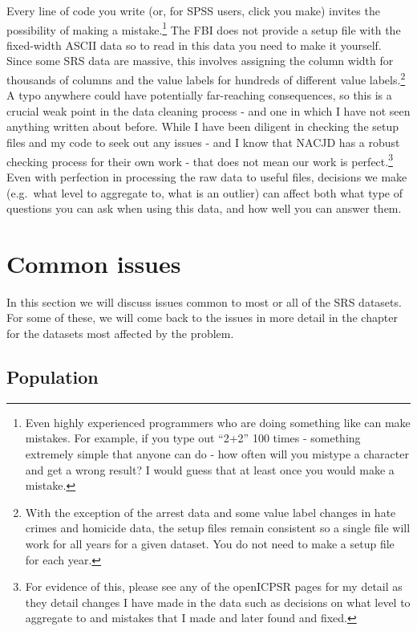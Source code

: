 \documentclass[
]{krantz}
\begin{document}
Every line of code you write (or, for SPSS users, click you
make) invites the possibility of making a
mistake.\footnote{Even highly experienced programmers who
  are doing something like can make mistakes. For example,
  if you type out ``2+2'' 100 times - something extremely
  simple that anyone can do - how often will you mistype a
  character and get a wrong result? I would guess that at
  least once you would make a mistake.} The FBI does not
provide a setup file with the fixed-width ASCII data so to
read in this data you need to make it yourself. Since some
SRS data are massive, this involves assigning the column
width for thousands of columns and the value labels for
hundreds of different value labels.\footnote{With the
  exception of the arrest data and some value label changes
  in hate crimes and homicide data, the setup files remain
  consistent so a single file will work for all years for a
  given dataset. You do not need to make a setup file for
  each year.} A typo anywhere could have potentially
far-reaching consequences, so this is a crucial weak point
in the data cleaning process - and one in which I have not
seen anything written about before. While I have been
diligent in checking the setup files and my code to seek out
any issues - and I know that NACJD has a robust checking
process for their own work - that does not mean our work is
perfect.\footnote{For evidence of this, please see any of
  the openICPSR pages for my detail as they detail changes I
  have made in the data such as decisions on what level to
  aggregate to and mistakes that I made and later found and
  fixed.} Even with perfection in processing the raw data to
useful files, decisions we make (e.g.~what level to
aggregate to, what is an outlier) can affect both what type
of questions you can ask when using this data, and how well
you can answer them.

\section{Common issues}\label{common-issues}

In this section we will discuss issues common to most or all
of the SRS datasets. For some of these, we will come back to
the issues in more detail in the chapter for the datasets
most affected by the problem.

\subsection{Population}\label{population}
\end{document}
